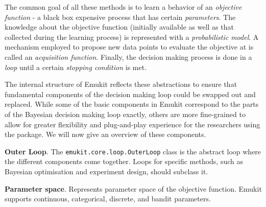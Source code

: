 The common goal of all these methods is to learn a behavior of an \textit{objective function} - a black box expensive process that has certain \textit{parameters}. The knowledge about the objective function (initially available as well as that collected during the learning process) is represented with a \textit{probabilistic model}. A mechanism employed to propose new data points to evaluate the objective at is called an \textit{acquisition function}. Finally, the decision making process is done in a \textit{loop} until a certain \textit{stopping condition} is met. 


The internal structure of Emukit reflects these abstractions to ensure that fundamental components of the decision making loop could be swapped out and replaced. While some of the basic components in Emukit correspond to the parts of the Bayesian decision making loop exactly, others are more fine-grained to allow for greater flexibility and plug-and-play experience for the researchers using the package. We will now give an overview of these components.

\textbf{Outer Loop}. The \texttt{emukit.core.loop.OuterLoop} class is the abstract loop where the different components come together. Loops for specific methods, such as Bayesian optimisation and experiment design, should subclass it.

\textbf{Parameter space}. Represents parameter space of the objective function. Emukit supports continuous, categorical, discrete, and bandit parameters.

